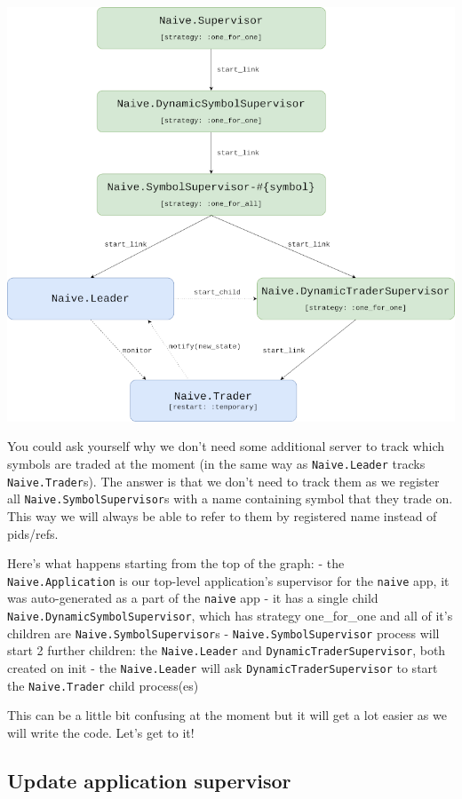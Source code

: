 \documentclass[
  oneside]{book}
\begin{document}
\includegraphics{images/chapter_05_05_full.png}

You could ask yourself why we don't need some additional server to track which symbols are traded at the moment (in the same way as \texttt{Naive.Leader} tracks \texttt{Naive.Trader}s). The answer is that we don't need to track them as we register all \texttt{Naive.SymbolSupervisor}s with a name containing symbol that they trade on. This way we will always be able to refer to them by registered name instead of pids/refs.

Here's what happens starting from the top of the graph:
- the \texttt{Naive.Application} is our top-level application's supervisor for the \texttt{naive} app, it was auto-generated as a part of the \texttt{naive} app
- it has a single child \texttt{Naive.DynamicSymbolSupervisor}, which has strategy one\_for\_one and all of it's children are \texttt{Naive.SymbolSupervisor}s
- \texttt{Naive.SymbolSupervisor} process will start 2 further children: the \texttt{Naive.Leader} and \texttt{DynamicTraderSupervisor}, both created on init
- the \texttt{Naive.Leader} will ask \texttt{DynamicTraderSupervisor} to start the \texttt{Naive.Trader} child process(es)

This can be a little bit confusing at the moment but it will get a lot easier
as we will write the code. Let's get to it!

\hypertarget{update-application-supervisor}{%
\subsection{Update application supervisor}\label{update-application-supervisor}}
\end{document}
